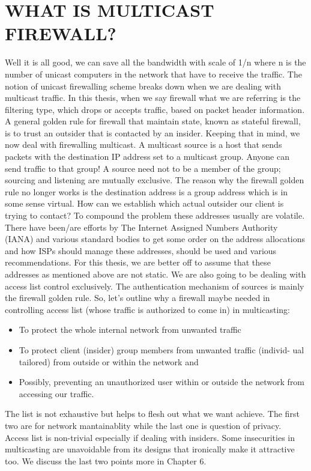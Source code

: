 \documentclass[11pt,left=2cm,bottom=2cm,oneside]{book}
\begin{document}
\section{WHAT IS MULTICAST FIREWALL?}
Well it is all good, we can save all the bandwidth with scale of 1/n where n
is the number of unicast computers in the network that have to receive the
traffic.
The notion of unicast firewalling scheme breaks down when we are dealing with
multicast traffic. In this thesis, when we say firewall what we are referring
is the
filtering type, which drops or accepts traffic, based on packet header
information.
A general golden rule for firewall that maintain state, known as stateful
firewall, is
to trust an outsider that is contacted by an insider. Keeping that in mind, we
now
deal with firewalling multicast.
A multicast source is a host that sends packets with the destination IP
address
set to a multicast group. Anyone can send traffic to that group! A source need
not
to be a member of the group; sourcing and listening are mutually exclusive.
The
reason why the firewall golden rule no longer works is the destination address
is a
group address which is in some sense virtual. How can we establish which
actual
outsider our client is trying to contact?
To compound the problem these addresses usually are volatile. There have
been/are efforts by The Internet Assigned Numbers Authority (IANA) and various
standard bodies to get some order on the address allocations and how ISPs
should
manage these addresses, should be used and various recommendations. For this
thesis, we are better off to assume that these addresses as mentioned above
are not
static. We are also going to be dealing with access list control exclusively.
The
authentication mechanism of sources is mainly the firewall golden rule.
So, let's outline why a firewall maybe needed in controlling access list
(whose
traffic is authorized to come in) in multicasting:
\begin{itemize}
\item To protect the whole internal network from unwanted traffic
\item To protect client (insider) group members from unwanted traffic (individ-
ual tailored) from outside or within the network and
\item Possibly, preventing an unauthorized user within or outside the network
from accessing our traffic.
\end{itemize}
The list is not exhaustive but helps to flesh out what we want achieve. The
first two
are for network mantainablity while the last one is question of privacy.
Access list
is non-trivial especially if dealing with insiders. Some insecurities in
multicasting
are unavoidable from its designs that ironically make it attractive too. We
discuss
the last two points more in Chapter 6.
\end{document}
